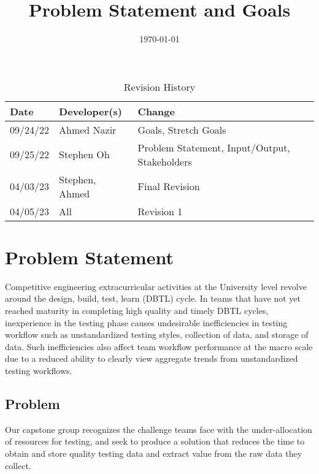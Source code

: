 \documentclass[12pt,titlepage]{article}
\title{\huge Problem Statement and Goals\\\progname}
\author{\authname}
\date{\today}
\begin{document}
\maketitle
\newpage

\begin{table}[hp]
\caption{Revision History} \label{TblRevisionHistory}
\begin{tabularx}{\textwidth}{llX}
\toprule
\textbf{Date} & \textbf{Developer(s)} & \textbf{Change}\\
\midrule
09/24/22 & Ahmed Nazir & Goals, Stretch Goals\\
09/25/22 & Stephen Oh & Problem Statement, Input/Output, Stakeholders\\
04/03/23 & Stephen, Ahmed & Final Revision\\
04/05/23 & All & Revision 1\\
\bottomrule
\end{tabularx}
\end{table}

\newpage
\tableofcontents
\listoftables


\newpage
\section{Problem Statement}

Competitive engineering extracurricular activities at the University level revolve around the design, build,
test, learn (DBTL) cycle. In teams that have not yet reached maturity in completing high quality and
timely DBTL cycles, inexperience in the testing phase causes undesirable inefficiencies in testing
workflow such as unstandardized testing styles, collection of data, and storage of data. Such
inefficiencies also affect team workflow performance at the macro scale due to a reduced ability to
clearly view aggregate trends from unstandardized testing workflows. 

\subsection{Problem}

Our capstone group recognizes the challenge teams face with the under-allocation of resources for testing, and seek to produce a solution that reduces the time to obtain and store quality testing data and extract value from the raw data they collect. \\ 
\end{document}
